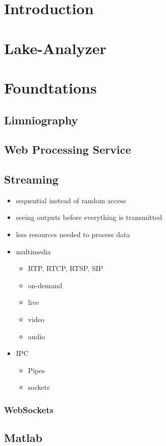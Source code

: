 \section{Introduction}
\section{Lake-Analyzer}
\section{Foundtations}
	\subsection{Limniography}
	\subsection{Web Processing Service}
	\subsection{Streaming}
		\begin{itemize}
			\item sequential instead of random access
			\item seeing outputs before everything is transmitted
			\item less resources needed to process data
			\item multimedia
			\begin{itemize}
				\item RTP, RTCP, RTSP, SIP
				\item on-demand
				\item live
				\item video
				\item audio
			\end{itemize}
			\item IPC
			\begin{itemize}
				\item Pipes
				\item sockets
			\end{itemize}
		\end{itemize}
		\subsubsection{WebSockets}
	\subsection{Matlab}
